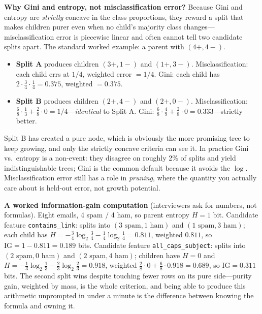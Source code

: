 \textbf{Why Gini and entropy, not misclassification error?} Because Gini and entropy are \textit{strictly} concave in the class proportions, they reward a split that makes children purer even when no child's majority class changes---misclassification error is piecewise linear and often cannot tell two candidate splits apart. The standard worked example: a parent with $(4{+}, 4{-})$.
\begin{itemize}
    \item \textbf{Split A} produces children $(3{+}, 1{-})$ and $(1{+}, 3{-})$. Misclassification: each child errs at $1/4$, weighted error $= 1/4$. Gini: each child has $2 \cdot \tfrac{3}{4} \cdot \tfrac{1}{4} = 0.375$, weighted $= 0.375$.
    \item \textbf{Split B} produces children $(2{+}, 4{-})$ and $(2{+}, 0{-})$. Misclassification: $\tfrac{6}{8}\cdot\tfrac{1}{3} + \tfrac{2}{8}\cdot 0 = 1/4$---\textit{identical} to Split A. Gini: $\tfrac{6}{8}\cdot\tfrac{4}{9} + \tfrac{2}{8}\cdot 0 = 0.333$---strictly better.
\end{itemize}
Split B has created a pure node, which is obviously the more promising tree to keep growing, and only the strictly concave criteria can see it. In practice Gini vs.\ entropy is a non-event: they disagree on roughly 2\% of splits and yield indistinguishable trees; Gini is the common default because it avoids the $\log$. Misclassification error still has a role in \textit{pruning}, where the quantity you actually care about is held-out error, not growth potential.

\textbf{A worked information-gain computation} (interviewers ask for numbers, not formulas). Eight emails, 4 spam / 4 ham, so parent entropy $H = 1$ bit. Candidate feature \texttt{contains\_link}: splits into $(3\text{ spam}, 1\text{ ham})$ and $(1\text{ spam}, 3\text{ ham})$; each child has $H = -\tfrac{3}{4}\log_2\tfrac{3}{4} - \tfrac{1}{4}\log_2\tfrac{1}{4} = 0.811$, weighted $0.811$, so $\text{IG} = 1 - 0.811 = 0.189$ bits. Candidate feature \texttt{all\_caps\_subject}: splits into $(2\text{ spam}, 0\text{ ham})$ and $(2\text{ spam}, 4\text{ ham})$; children have $H = 0$ and $H = -\tfrac{1}{3}\log_2\tfrac{1}{3} - \tfrac{2}{3}\log_2\tfrac{2}{3} = 0.918$, weighted $\tfrac{2}{8}\cdot 0 + \tfrac{6}{8}\cdot 0.918 = 0.689$, so $\text{IG} = 0.311$ bits. The second split wins despite touching fewer rows on its pure side---purity gain, weighted by mass, is the whole criterion, and being able to produce this arithmetic unprompted in under a minute is the difference between knowing the formula and owning it.

